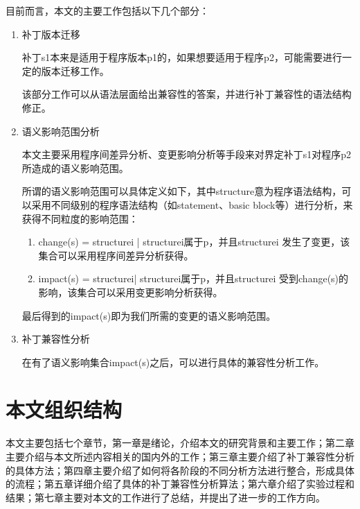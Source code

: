 目前而言，本文的主要工作包括以下几个部分：

\begin{enumerate}
	\item
	补丁版本迁移

补丁s1本来是适用于程序版本p1的，如果想要适用于程序p2，可能需要进行一定的版本迁移工作。

该部分工作可以从语法层面给出兼容性的答案，并进行补丁兼容性的语法结构修正。

	\item
	语义影响范围分析

本文主要采用程序间差异分析、变更影响分析等手段来对界定补丁s1对程序p2所造成的语义影响范围。

所谓的语义影响范围可以具体定义如下，其中structure意为程序语法结构，可以采用不同级别的程序语法结构（如statement、basic block等）进行分析，来获得不同粒度的影响范围：
	\begin{enumerate}
		\item
		change(s) = { structurei | structurei属于p，并且structurei 发生了变更}，该集合可以采用程序间差异分析获得。
		
		\item
		impact(s) = {structurei| structurei属于p，并且structurei 受到change(s)的影响}，该集合可以采用变更影响分析获得。
		
	\end{enumerate}
最后得到的impact(s)即为我们所需的变更的语义影响范围。

	\item
	补丁兼容性分析

在有了语义影响集合impact(s)之后，可以进行具体的兼容性分析工作。
\end{enumerate}

\section{本文组织结构}

本文主要包括七个章节，第一章是绪论，介绍本文的研究背景和主要工作；第二章主要介绍与本文所述内容相关的国内外的工作；第三章主要介绍了补丁兼容性分析的具体方法；第四章主要介绍了如何将各阶段的不同分析方法进行整合，形成具体的流程；第五章详细介绍了具体的补丁兼容性分析算法；第六章介绍了实验过程和结果；第七章主要对本文的工作进行了总结，并提出了进一步的工作方向。


